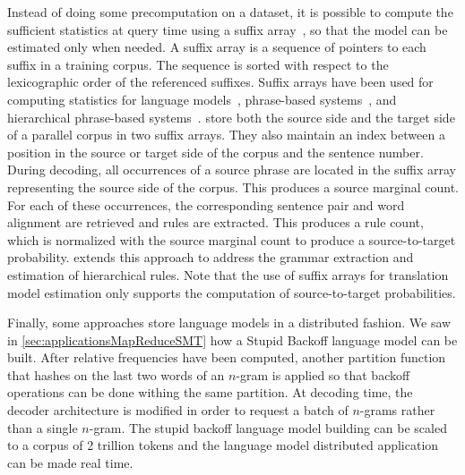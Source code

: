 Instead of doing some precomputation on a dataset, it is possible to compute
the sufficient
statistics at query time using a suffix array~\citep{manber-myers:1990:SIAM}, so
that the model can be estimated only when needed. A suffix array is a sequence of
pointers to each suffix in a training corpus. The sequence is sorted with
respect to the lexicographic order of the referenced suffixes. Suffix arrays
have been used for computing statistics for language
models~\citep{zhang-vogel:2006:techreport}, phrase-based
systems~\citep{callisonburch-bannard-schroeder:2005:ACL,zhang-vogel:2005:EAMT},
and hierarchical phrase-based systems~\citep{lopez:2007:EMNLP-CoNLL}.
\citet{callisonburch-bannard-schroeder:2005:ACL} store both the source side
and the target side of a parallel corpus in two suffix arrays. They also maintain
an index between a position in the source or target side of the corpus and the
sentence number. During decoding, all occurrences of a source phrase
are located in the suffix array representing the source side of the corpus.
This produces a source marginal count. For each of these occurrences, the corresponding
sentence pair and word alignment are retrieved and rules are extracted. This produces
a rule count, which is normalized with the source marginal count to produce a
source-to-target probability. \citet{lopez:2007:EMNLP-CoNLL} extends this approach
to address the grammar extraction and estimation of hierarchical rules.
Note that the use of suffix arrays for translation model estimation only
supports the computation of source-to-target probabilities.



Finally, some approaches store language models in a distributed fashion.
We saw in \autoref{sec:applicationsMapReduceSMT} how a Stupid Backoff language
model can be built. After relative frequencies have been computed, another
partition function that hashes on the last two words of an $n$-gram is applied
so that backoff operations can be done withing the same partition.
At decoding time, the decoder architecture is modified in order
to request a batch of $n$-grams rather than a single $n$-gram.
The stupid backoff language model building can be scaled
to a corpus of 2 trillion tokens and the language model distributed
application can be made real time.

